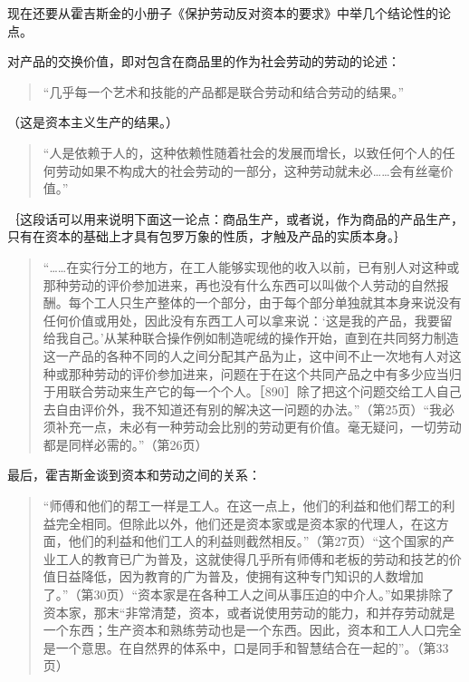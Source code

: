 
现在还要从霍吉斯金的小册子《保护劳动反对资本的要求》中举几个结论性的论点。

对产品的交换价值，即对包含在商品里的作为社会劳动的劳动的论述：

\begin{quote}{“几乎每一个艺术和技能的产品都是联合劳动和结合劳动的结果。”}\end{quote}

（这是资本主义生产的结果。）

\begin{quote}{“人是依赖于人的，这种依赖性随着社会的发展而增长，以致任何个人的任何劳动如果不构成大的社会劳动的一部分，这种劳动就未必……会有丝毫价值。”}\end{quote}

｛这段话可以用来说明下面这一论点：商品生产，或者说，作为商品的产品生产，只有在资本的基础上才具有包罗万象的性质，才触及产品的实质本身。｝

\begin{quote}{“……在实行分工的地方，在工人能够实现他的收入以前，已有别人对这种或那种劳动的评价参加进来，再也没有什么东西可以叫做个人劳动的自然报酬。每个工人只生产整体的一个部分，由于每个部分单独就其本身来说没有任何价值或用处，因此没有东西工人可以拿来说：‘这是我的产品，我要留给我自己。’从某种联合操作例如制造呢绒的操作开始，直到在共同努力制造这一产品的各种不同的人之间分配其产品为止，这中间不止一次地有人对这种或那种劳动的评价参加进来，问题在于在这个共同产品之中有多少应当归于用联合劳动来生产它的每一个个人。［890］除了把这个问题交给工人自己去自由评价外，我不知道还有别的解决这一问题的办法。”（第25页）“我必须补充一点，未必有一种劳动会比别的劳动更有价值。毫无疑问，一切劳动都是同样必需的。”（第26页）}\end{quote}

最后，霍吉斯金谈到资本和劳动之间的关系：

\begin{quote}{“师傅和他们的帮工一样是工人。在这一点上，他们的利益和他们帮工的利益完全相同。但除此以外，他们还是资本家或是资本家的代理人，在这方面，他们的利益和他们工人的利益则截然相反。”（第27页）“这个国家的产业工人的教育已广为普及，这就使得几乎所有师傅和老板的劳动和技艺的价值日益降低，因为教育的广为普及，使拥有这种专门知识的人数增加了。”（第30页）“资本家是在各种工人之间从事压迫的中介人。”如果排除了资本家，那末“非常清楚，资本，或者说使用劳动的能力，和并存劳动就是一个东西；生产资本和熟练劳动也是一个东西。因此，资本和工人人口完全是一个意思。在自然界的体系中，口是同手和智慧结合在一起的”。（第33页）}\end{quote}

